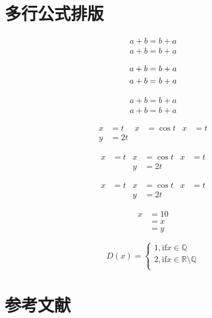 \documentclass[8pt]{article}
\begin{document}
	
	\section{多行公式排版}
	
	\begin{gather}
		a + b = b + a \\
		a + b = b + a
	\end{gather}
	
	\begin{gather}
		a + b = b + a \notag \\
		a + b = b + a \notag
	\end{gather}
	
	\begin{gather*}
		a + b = b + a \\
		a + b = b + a
	\end{gather*}
	
	\begin{align}
		x &= t & x &= \cos t & x &= t \\
		y &= 2t
	\end{align}
	
	\begin{align}
		x &= t & x &= \cos t & x &= t \\
		&& y &= 2t 
	\end{align}
	
	
	\begin{align*}
		x &= t & x &= \cos t & x &= t \\
		&& y &= 2t 
	\end{align*}
	
	\begin{equation}
		\begin{split}
			x &= 10 \\
			&= x \\
			&= y
		\end{split}
	\end{equation}
	
	\begin{equation}
		D(x) = \begin{cases}
			1, \text{if} x \in \mathbb{Q} \\
			2, \text{if} x \in \mathbb{R} \setminus \mathbb{Q} \\
		\end{cases}
	\end{equation}
	
	\section{参考文献}
	
\end{document}
